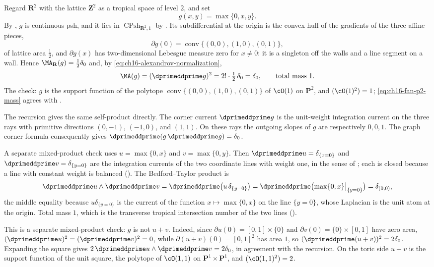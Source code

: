 \begin{example}
\label{ex:ch16-fan-p2}
Regard $\mathbf R^2$ with the lattice $\mathbf Z^2$ as a tropical space of
level $2$, and set
\[
 g(x,y)=\max\{0,x,y\}.
\]
By , $g$ is continuous psh, and it lies in
$\operatorname{CPsh}_{\mathbf R^2,1}$ by
.  Its subdifferential at the origin is
the convex hull of the gradients of the three affine pieces,
\[
 \partial g(0)=\operatorname{conv}\{(0,0),(1,0),(0,1)\},
\]
of lattice area $\tfrac12$, and $\partial g(x)$ has two-dimensional
Lebesgue measure zero for $x\neq0$: it is a singleton off the walls and a
line segment on a wall.  Hence
$\MA_{\mathbf R}(g)=\tfrac12\delta_0$ and, by
\eqref{eq:ch16-alexandrov-normalization},
\begin{equation}
\label{eq:ch16-fan-p2-mass}
 \MA(g)=(\dprimeddprime g)^2=2!\cdot\tfrac12\,\delta_0=\delta_0,
 \qquad\text{total mass }1.
\end{equation}
The check: $g$ is the support function of the polytope
$\operatorname{conv}\{(0,0),(1,0),(0,1)\}$ of $\cO(1)$ on $\mathbf P^2$, and
$(\cO(1)^2)=1$; \eqref{eq:ch16-fan-p2-mass} agrees with
.

The recursion gives the same self-product directly.  The corner current
$\dprimeddprime g$ is the unit-weight integration current on the three rays
with primitive directions $(0,-1)$, $(-1,0)$, and $(1,1)$.
On these rays the outgoing slopes of $g$ are respectively $0,0,1$.
The graph corner formula consequently gives
$\dprimeddprime(g\,\dprimeddprime g)=\delta_0$.

A separate mixed-product check uses $u=\max\{0,x\}$ and
$v=\max\{0,y\}$.  Then
$\dprimeddprime u=\delta_{\{x=0\}}$ and $\dprimeddprime v=\delta_{\{y=0\}}$
are the integration currents of the two coordinate lines with weight one, in
the sense of ; each is closed because a
line with constant weight is balanced
().  The Bedford--Taylor product is
\[
 \dprimeddprime u\wedge\dprimeddprime v
 =\dprimeddprime\bigl(u\,\delta_{\{y=0\}}\bigr)
 =\dprimeddprime\bigl(\max\{0,x\}\big|_{\{y=0\}}\bigr)
 =\delta_{(0,0)},
\]
the middle equality because $u\delta_{\{y=0\}}$ is the current of the
function $x\mapsto\max\{0,x\}$ on the line $\{y=0\}$, whose Laplacian is the
unit atom at the origin.  Total mass $1$, which is the transverse tropical
intersection number of the two lines ().

This is a separate mixed-product check: $g$ is not $u+v$.  Indeed, since
$\partial u(0)=[0,1]\times\{0\}$ and $\partial v(0)=\{0\}\times[0,1]$ have
zero area, $(\dprimeddprime u)^2=(\dprimeddprime v)^2=0$, while
$\partial(u+v)(0)=[0,1]^2$ has area $1$, so
$(\dprimeddprime(u+v))^2=2\delta_0$.  Expanding the square gives
$2\,\dprimeddprime u\wedge\dprimeddprime v=2\delta_0$, in agreement with the
recursion.  On the toric side $u+v$ is the support function of the unit
square, the polytope of $\cO(1,1)$ on $\mathbf P^1\times\mathbf P^1$, and
$(\cO(1,1)^2)=2$.
\end{example}

